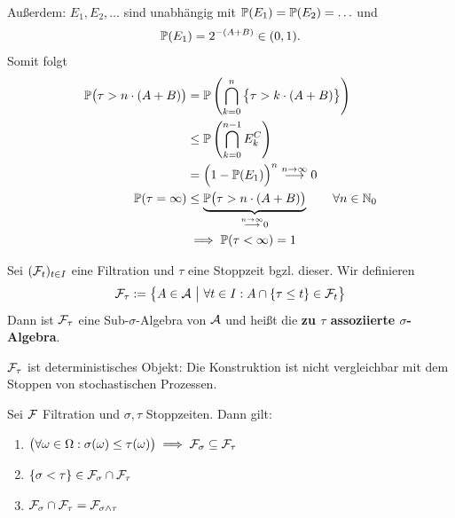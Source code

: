 \begin{beisp}
	Außerdem: $E_1,E_2,\ldots$ sind unabhängig mit $\P(E_1)=\P(E_2)=\ldots$ und
	\begin{align*}
		\P(E_1)=2^{-(A+B)}\in(0,1).
	\end{align*}
	Somit folgt
	\begin{align*}
		\P\big(\tau>n\cdot(A+B)\big)&=\P\left(\bigcap\limits_{k=0}^n\big\lbrace\tau > k\cdot (A+B)\big\rbrace\right)\\
		&\leq\P\left(\bigcap\limits_{k=0}^{n-1} E_k^C\right)\\
		&=\Big(1-\P(E_1)\Big)^n\stackrel{n\to\infty}{\longrightarrow}0\\
		\P(\tau=\infty)&\leq\underbrace{\P\big(\tau> n\cdot(A+B)\big)}_{\stackrel{n\to\infty}{\longrightarrow}0}\qquad\forall n\in\N_0\\
		&\implies
		\P(\tau<\infty)=1
	\end{align*}
\end{beisp}

\begin{defi}
	Sei $(\F_t)_{t\in I}$ eine Filtration und $\tau$ eine Stoppzeit bgzl. dieser. Wir definieren 
	\begin{align*}
		\F_\tau:=\big\lbrace A\in\A~\big|~\forall t\in I:A\cap\lbrace\tau\leq t\rbrace\in\F_t\big\rbrace
	\end{align*}
	Dann ist $\F_\tau$ eine Sub-$\sigma$-Algebra von $\A$ und heißt die \textbf{zu $\tau$ assoziierte $\sigma$-Algebra}.
\end{defi}

\begin{bemerkung}
	$\F_\tau$ ist deterministisches Objekt: Die Konstruktion ist nicht vergleichbar mit dem Stoppen von stochastischen Prozessen.
\end{bemerkung}

\setcounter{satz}{2} %
\begin{lemma}\label{lemma3.3}
	Sei $\F$ Filtration und $\sigma,\tau$ Stoppzeiten. Dann gilt:
	\begin{enumerate}[label=(\alph*)]
		\item $\begin{aligned}
			\big(\forall\omega\in\Omega:\sigma(\omega)\leq\tau(\omega)\big)\implies\F_\sigma\subseteq\F_\tau
		\end{aligned}$
		\item $\begin{aligned}
			\lbrace\sigma<\tau\rbrace\in\F_\sigma\cap\F_\tau
		\end{aligned}$
		\item $\begin{aligned}
			\F_\sigma\cap\F_\tau=\F_{\sigma\wedge\tau}
		\end{aligned}$
	\end{enumerate}
\end{lemma}

